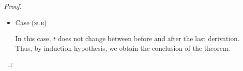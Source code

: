 \begin{proof}
\begin{itemize}
\begin{itemize}
\item Suppose $t_1$ is not a value.\\
There exists a term $t_1$ such that:
\begin{align*}
    \begin{minipage}{.13\linewidth}
        \infrule[]{
            t_1 \leadsto t'_1
        }{
            t_1 \longrightarrow t'_1
        }
    \end{minipage}
\end{align*}
Also, we can apply an exaluation rule for extraction to $t$.
\begin{center}
    \begin{minipage}{.15\linewidth}
    \end{minipage}
\end{center}
Thus, by choosing $t'=t_1'.l_k$, we obtain the conclusion of the theorem.\\
\end{itemize}


\item Case (\textsc{sub})
\begin{center}
    \begin{minipage}{.65\linewidth}
    \end{minipage}
\end{center}
In this case, $t$ does not change between before and after the last derivation.
Thus, by induction hypothesis, we obtain the conclusion of the theorem.

\end{itemize}
\end{proof}



















